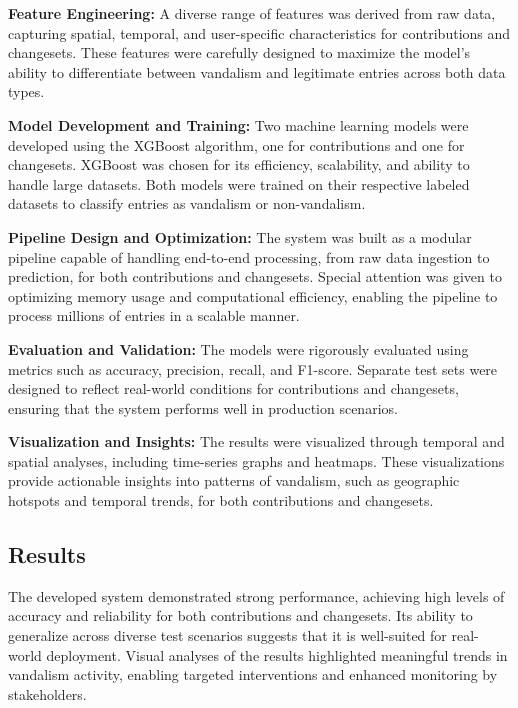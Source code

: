 \documentclass[
    13pt, %
    a4paper, %
    twoside, 
    DIV14, %
    listof=totoc, %
    bibliography=totoc, %
    index=totoc, %
    headsepline
]{scrreprt}
\begin{document}
\noindent\textbf{Feature Engineering:} A diverse range of features was derived from raw data, capturing spatial, temporal, and user-specific characteristics for contributions and changesets. These features were carefully designed to maximize the model's ability to differentiate between vandalism and legitimate entries across both data types.

\noindent\textbf{Model Development and Training:} Two machine learning models were developed using the XGBoost algorithm, one for contributions and one for changesets. XGBoost was chosen for its efficiency, scalability, and ability to handle large datasets. Both models were trained on their respective labeled datasets to classify entries as vandalism or non-vandalism.

\noindent\textbf{Pipeline Design and Optimization:} The system was built as a modular pipeline capable of handling end-to-end processing, from raw data ingestion to prediction, for both contributions and changesets. Special attention was given to optimizing memory usage and computational efficiency, enabling the pipeline to process millions of entries in a scalable manner.

\noindent\textbf{Evaluation and Validation:} The models were rigorously evaluated using metrics such as accuracy, precision, recall, and F1-score. Separate test sets were designed to reflect real-world conditions for contributions and changesets, ensuring that the system performs well in production scenarios.

\noindent\textbf{Visualization and Insights:} The results were visualized through temporal and spatial analyses, including time-series graphs and heatmaps. These visualizations provide actionable insights into patterns of vandalism, such as geographic hotspots and temporal trends, for both contributions and changesets.

\subsection*{Results}

The developed system demonstrated strong performance, achieving high levels of accuracy and reliability for both contributions and changesets. Its ability to generalize across diverse test scenarios suggests that it is well-suited for real-world deployment. Visual analyses of the results highlighted meaningful trends in vandalism activity, enabling targeted interventions and enhanced monitoring by stakeholders.
\end{document}
